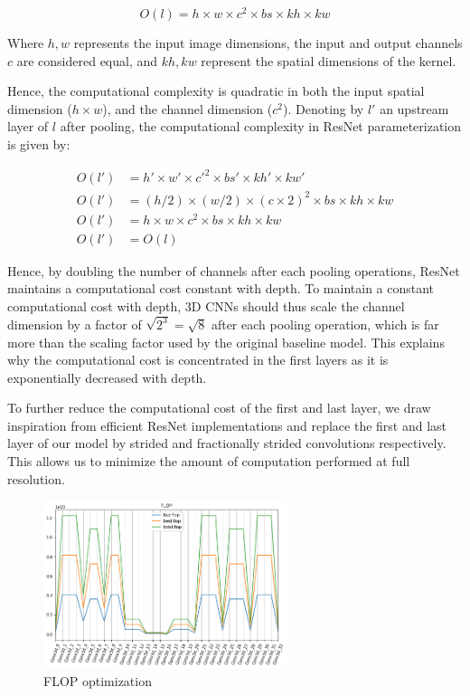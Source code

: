 \documentclass[runningheads]{llncs}
\begin{document}
$$ O(l) = h \times w \times c^2 \times bs  \times kh  \times kw $$

Where $h,w$ represents the input image dimensions, 
the input and output channels $c$ are considered equal, 
and $kh,kw$ represent the spatial dimensions of the kernel.

Hence, the computational complexity is quadratic in both the input spatial dimension ($h \times w$),
and the channel dimension ($c^2$).
Denoting by $l'$ an upstream layer of $l$ after pooling, the computational complexity in ResNet parameterization is given by:


\begin{subequations} 
\begin{align}
O(l') &= h' \times w' \times c'^2 \times bs'  \times kh'  \times kw'  \\
O(l') &= (h/2) \times (w/2) \times (c \times 2)^2 \times bs  \times kh  \times kw   \\
O(l') &= h \times w \times c^2 \times bs  \times kh  \times kw   \\
O(l') &= O(l) 
\end{align}
\end{subequations}


Hence, by doubling the number of channels after each pooling operations, ResNet maintains a computational cost constant with depth.
To maintain a constant computational cost with depth, 3D CNNs should thus scale the channel dimension
by a factor of $\sqrt{2^3}=\sqrt{8}$ after each pooling operation, 
which is far more than the scaling factor used by the original baseline model.
This explains why the computational cost is concentrated in the first layers as 
it is exponentially decreased with depth.

To further reduce the computational cost of the first and last layer, 
we draw inspiration from efficient ResNet implementations and replace the first and
last layer of our model by strided and fractionally strided convolutions respectively.
This allows us to minimize the amount of computation performed at full resolution.

\begin{figure}[h]
\centering
\includegraphics[width=2.8in]{optimize_model_FLOP.png}
\caption{FLOP optimization}
\end{figure}%
\end{document}
